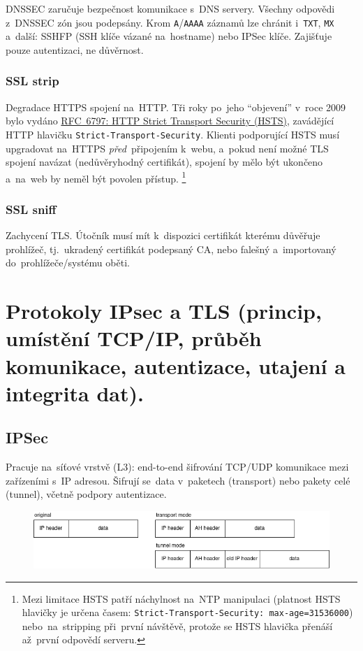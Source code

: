 DNSSEC zaručuje bezpečnost komunikace s~DNS servery. Všechny odpovědi z~DNSSEC zón jsou podepsány. Krom \texttt{A}/\texttt{AAAA} záznamů lze chránit i~\texttt{TXT}, \texttt{MX} a~další: SSHFP (SSH klíče vázané na~hostname) nebo IPSec klíče. Zajišťuje pouze autentizaci, ne důvěrnost.

\subsubsection{SSL strip}

Degradace HTTPS spojení na~HTTP. Tři roky po~jeho \enquote{objevení} v~roce 2009 bylo vydáno \href{https://datatracker.ietf.org/doc/html/rfc6797}{RFC~6797: HTTP Strict Transport Security (HSTS)}, zavádějící HTTP hlavičku \texttt{Strict-Transport-Security}. Klienti podporující HSTS musí upgradovat na~HTTPS \emph{před}~připojením k~webu, a~pokud není možné TLS spojení navázat (nedůvěryhodný certifikát), spojení by mělo být ukončeno a~na~web by neměl být povolen přístup.%
\footnote{Mezi limitace HSTS patří náchylnost na~NTP manipulaci (platnost HSTS hlavičky je určena časem: \texttt{Strict-Transport-Security: max-age=31536000}) nebo~na~stripping při~první návštěvě, protože se HSTS hlavička přenáší až~první odpovědí serveru.}

\subsubsection{SSL sniff}

Zachycení TLS. Útočník musí mít k~dispozici certifikát kterému důvěřuje prohlížeč, tj.~ukradený certifikát podepsaný CA, nebo falešný a~importovaný do~prohlížeče/systému oběti.

\clearpage
\section{Protokoly IPsec a TLS (princip, umístění TCP/IP, průběh komunikace, autentizace, utajení a integrita dat).}

\subsection{IPSec}

Pracuje na~síťové vrstvě (L3): end-to-end šifrování TCP/UDP komunikace mezi zařízeními s~IP adresou. Šifrují se~data v~paketech (transport) nebo pakety celé (tunnel), včetně podpory autentizace.

\begin{figure}[ht]
\centering
\includegraphics[width=\textwidth]{images/ipsec}
\end{figure}

